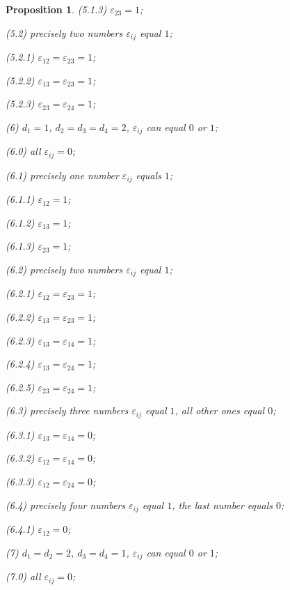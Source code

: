 \documentclass[14pt]{article}
\newtheorem{proposition}{\indent Proposition}[section]
\begin{document}
\begin{proposition}
\hskip 1cm (5.1.3)  $\varepsilon_{23} = 1$;

\hskip 0.5cm (5.2) precisely two numbers $\varepsilon_{ij}$ equal $1$;

\hskip 1cm (5.2.1)  $\varepsilon_{12} = \varepsilon_{23} = 1$;

\hskip 1cm (5.2.2)  $\varepsilon_{13} = \varepsilon_{23} = 1$;

\hskip 1cm (5.2.3)  $\varepsilon_{23} = \varepsilon_{24} = 1$;

(6) $d_1 = 1$, $d_2 =  d_3 = d_4 = 2$, $\varepsilon_{ij}$ can equal $0$ or $1$;

\hskip 0.5cm (6.0) all $\varepsilon_{ij} = 0$;

\hskip 0.5cm (6.1) precisely one number  $\varepsilon_{ij}$  equals $1$;

\hskip 1cm (6.1.1)  $\varepsilon_{12} = 1$;

\hskip 1cm (6.1.2)  $\varepsilon_{13} = 1$;

\hskip 1cm (6.1.3)  $\varepsilon_{23} = 1$;

\hskip 0.5cm (6.2) precisely two numbers  $\varepsilon_{ij}$  equal $1$;

\hskip 1cm (6.2.1)  $\varepsilon_{12} = \varepsilon_{23} = 1$;

\hskip 1cm (6.2.2)  $\varepsilon_{13} = \varepsilon_{23} = 1$;

\hskip 1cm (6.2.3)  $\varepsilon_{13} = \varepsilon_{14} = 1$;

\hskip 1cm (6.2.4)  $\varepsilon_{13} = \varepsilon_{24} = 1$;

\hskip 1cm (6.2.5)  $\varepsilon_{23} = \varepsilon_{24} = 1$;

\hskip 0.5cm (6.3) precisely three numbers $\varepsilon_{ij}$ equal $1$,
all other ones equal $0$;

\hskip 1cm (6.3.1)  $\varepsilon_{13} = \varepsilon_{14} = 0$;

\hskip 1cm (6.3.2)  $\varepsilon_{12} = \varepsilon_{14} = 0$;

\hskip 1cm (6.3.3)  $\varepsilon_{12} = \varepsilon_{24} = 0$;


\hskip 0.5cm (6.4) precisely four numbers $\varepsilon_{ij}$ equal $1$,
the last number  equals $0$;

\hskip 1cm (6.4.1)  $\varepsilon_{12} = 0$;

(7) $d_1 = d_2 = 2$, $d_3 = d_4 = 1$,  $\varepsilon_{ij}$ can equal $0$ or $1$;

\hskip 0.5cm (7.0) all $\varepsilon_{ij} = 0$;


\end{proposition}
\end{document}
